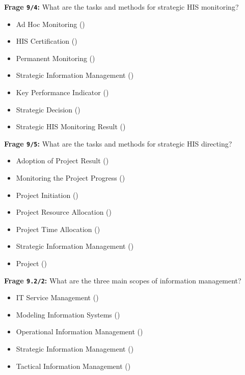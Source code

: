 \textbf{Frage \texttt{9/4}:} What are the tasks and methods for strategic HIS monitoring?

\begin{itemize}
  \item Ad Hoc Monitoring ()
  \item HIS Certification ()
  \item Permanent Monitoring ()
  \item Strategic Information Management ()
  \item Key Performance Indicator ()
  \item Strategic Decision ()
  \item Strategic HIS Monitoring Result ()
\end{itemize}

\textbf{Frage \texttt{9/5}:} What are the tasks and methods for strategic HIS directing?

\begin{itemize}
  \item Adoption of Project Result ()
  \item Monitoring the Project Progress ()
  \item Project Initiation ()
  \item Project Resource Allocation ()
  \item Project Time Allocation ()
  \item Strategic Information Management ()
  \item Project ()
\end{itemize}

\textbf{Frage \texttt{9.2/2}:} What are the three main scopes of information management?

\begin{itemize}
  \item IT Service Management ()
  \item Modeling Information Systems ()
  \item Operational Information Management ()
  \item Strategic Information Management ()
  \item Tactical Information Management ()
\end{itemize}

